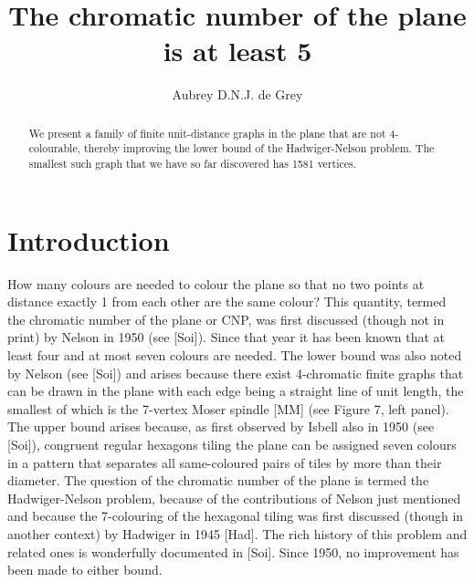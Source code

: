 \documentclass{amsart}
\theoremstyle{definition}
\theoremstyle{remark}
\numberwithin{equation}{section}
\begin{document}
\title{The chromatic number of the plane is at least 5}
\author{Aubrey D.N.J. de Grey}

\address{SENS Research Foundation, Mountain View, California 94041, USA; email: aubrey@sens.org}

\begin{abstract}
We present a family of finite unit-distance graphs in the plane that are not 4-colourable, thereby improving the lower bound of the Hadwiger-Nelson problem. The smallest such graph that we have so far discovered has 1581 vertices.
\end{abstract}

\maketitle

\section{Introduction}
How many colours are needed to colour the plane so that no two points at distance exactly 1 from each other are the same colour? This quantity, termed the chromatic number of the plane or CNP, was first discussed (though not in print) by Nelson in 1950 (see [Soi]). Since that year it has been known that at least four and at most seven colours are needed. The lower bound was also noted by Nelson (see [Soi]) and arises because there exist 4-chromatic finite graphs that can be drawn in the plane with each edge being a straight line of unit length, the smallest of which is the 7-vertex Moser spindle [MM] (see Figure 7, left panel). The upper bound arises because, as first observed by Isbell also in 1950 (see [Soi]), congruent regular hexagons tiling the plane can be assigned seven colours in a pattern that separates all same-coloured pairs of tiles by more than their diameter. The question of the chromatic number of the plane is termed the Hadwiger-Nelson problem, because of the contributions of Nelson just mentioned and because the 7-colouring of the hexagonal tiling was first discussed (though in another context) by Hadwiger in 1945 [Had]. The rich history of this problem and related ones is wonderfully documented in [Soi]. Since 1950, no improvement has been made to either bound.
\end{document}
